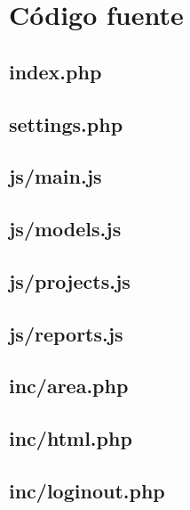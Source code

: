 \documentclass[11pt,a4paper,spanish,twoside]{book}
\begin{document}
\section{Código fuente}
\subsection{index.php}
%

\subsection{settings.php}
%

\subsection{js/main.js}
%

\subsection{js/models.js}
%

\subsection{js/projects.js}
%

\subsection{js/reports.js}
%

\subsection{inc/area.php}
%

\subsection{inc/html.php}
%

\subsection{inc/loginout.php}
%
\end{document}
